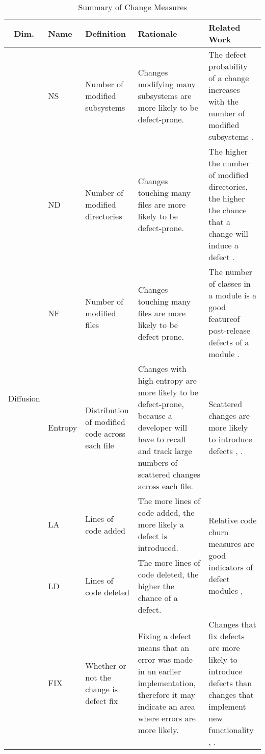 \documentclass[10pt, conference]{IEEEtran}
\begin{document}
\begin{table}
	\onecolumn
	\caption{Summary of Change Measures}
\begin{tabular}{|c|l|p{2.5cm}|p{5.5cm}|p{5.25cm}|}
	\hline Dim. & Name & Definition & Rationale & Related Work \\ 
	\hline \multirow{14}{*}{\begin{sideways}Diffusion\end{sideways}} & NS & Number of modified subsystems  & Changes modifying many subsystems are more likely to be defect-prone. & The defect probability of a change increases with the number of modified subsystems \cite{Mockus2000Bell}. \\ \cline{2-5}  
	 & ND & Number of modified directories & Changes touching many files are more likely to be defect-prone. & The higher the number of modified directories, the higher the chance that a change will induce a defect \cite{Mockus2000Bell}. \\ \cline{2-5}  
	 & NF & Number of modified files & Changes touching many files are more likely to be defect-prone. & The number of classes in a module is a good featureof post-release defects of a module \cite{Nagappan2006ICSE}. \\ \cline{2-5} 
	 & Entropy & Distribution of modified code across each file & Changes with high entropy are more likely to be defect-prone, because a developer will have to recall and track large numbers of scattered changes across each file. & Scattered changes are more likely to introduce defects \cite{DAmbross2010MSR}, \cite{Hassan2009ICSE}. \\ 
	\hline \multirow{4}{*}{\begin{sideways}Size\end{sideways}} & LA & Lines of code added & The more lines of code added, the more likely a defect is introduced. & \multirow{2}{5.25cm}{Relative code churn measures are good indicators of defect modules \cite{Moser2008ICSE}, \cite{Nagappan2005ICSE}}. \\ \cline{2-4} 
	  & LD & Lines of code deleted & The more lines of code deleted, the higher the chance of a defect. &  \\ 
	\hline \multirow{4}{*}{\begin{sideways}Purpose\end{sideways}} & FIX & Whether or not the change is defect fix & Fixing a defect means that an error was made in an earlier implementation, therefore it may indicate an area where errors are more likely. & Changes that fix defects are more likely to introduce defects than changes that implement new functionality \cite{Guo2010ICSE}, \cite{Purushothaman2005IEEE}. \\ 

\end{tabular}
\end{table}
\end{document}
